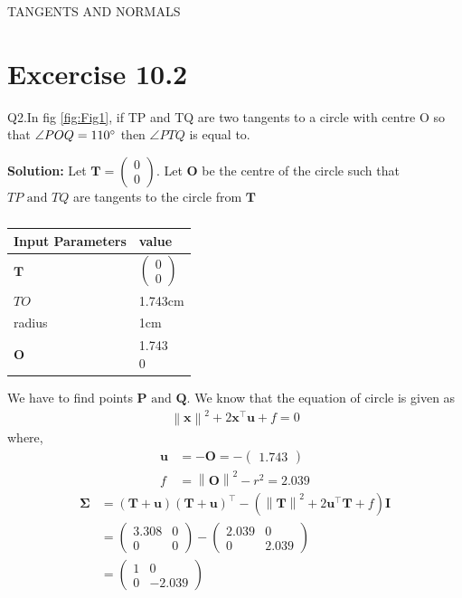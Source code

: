 \documentclass[12pt]{article}
\providecommand{\brak}[1]{\ensuremath{\left(#1\right)}}
\providecommand{\norm}[1]{\left\lVert#1\right\rVert}
\newcommand{\solution}{\noindent \textbf{Solution: }}
\newcommand{\myvec}[1]{\ensuremath{\begin{pmatrix}#1\end{pmatrix}}}
\let\vec\mathbf
\begin{document}
\begin{center}
\textbf\large{TANGENTS AND NORMALS}

\end{center}
\section*{Excercise 10.2}
Q2.In fig \ref{fig:Fig1}, if TP and TQ are two tangents to a circle with centre O so that $\angle{POQ} = 110\degree$ then $\angle{PTQ}$ is equal to.

\solution
Let $\vec{T} = \myvec{0\\0}$. Let $\vec{O}$ be the centre of the circle such that $TP \text{ and } TQ$ are tangents to the circle from $\vec{T}$
\begin{table}[h!]
\begin{center}
\begin{tabular}{|m{4cm}|m{2cm}|}
	\hline
	\textbf{Input Parameters} & \textbf{value}\\ 
	\hline
	$\vec{T}$ & $\myvec{0\\0}$\\
	\hline
	$TO$ & 1.743cm\\
	\hline
	radius & 1cm\\
	\hline
	$\vec{O}$ & \myvec{1.743\\0}\\
	\hline
\end{tabular}
\caption{}
\label{table:Table1}
\end{center}
\end{table}
We have to find points $\vec{P} \text{ and } \vec{Q}$. We know that the equation of circle is given as
\begin{align}
	\norm{\vec{x}}^2+2\vec{x}^\top \vec{u}+f=0
\end{align}
where,
\begin{align}
	\vec{u} &= -\vec{O} = -\myvec{1.743}\\
	f &= \norm{\vec{O}}^2 - r^2 = 2.039
\end{align}
\begin{align}
	\vec{\Sigma} &= \brak{\vec{T}+\vec{u}}\brak{\vec{T}+\vec{u}}^\top - \brak{\norm{\vec{T}}^2 + 2\vec{u}^\top \vec{T}+f}\vec{I}\\
	&=\myvec{3.308&0 \\ 0&0} - \myvec{2.039&0 \\ 0&2.039}\\
	\label{eq:eq1}
	&=\myvec{1&0\\0&-2.039}
\end{align}
\end{document}
